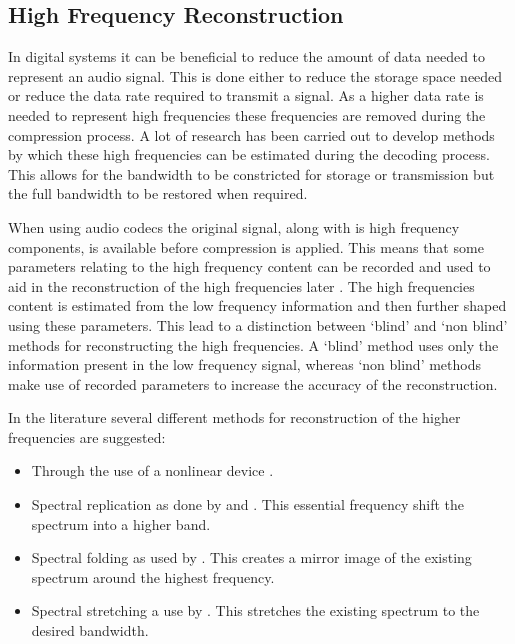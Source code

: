 	\subsection{High Frequency Reconstruction}
	\label{sec:Excitation-Uses-Reconstruction}
		In digital systems it can be beneficial to reduce the amount of data needed to represent an audio signal.
		This is done either to reduce the storage space needed or reduce the data rate required to transmit a
		signal. As a higher data rate is needed to represent high frequencies these frequencies are removed during
		the compression process. A lot of research has been carried out to develop methods by which these high
		frequencies can be estimated during the decoding process. This allows for the bandwidth to be constricted
		for storage or transmission but the full bandwidth to be restored when required.

		When using audio codecs the original signal, along with is high frequency components, is available before
		compression is applied. This means that some parameters relating to the high frequency content can be
		recorded and used to aid in the reconstruction of the high frequencies later \citep{friedrich2007spectral}.
		The high frequencies content is estimated from the low frequency information and then further shaped using
		these parameters. This lead to a distinction between `blind' and `non blind' methods for reconstructing the
		high frequencies. A `blind' method uses only the information present in the low frequency signal, whereas
		`non blind' methods make use of recorded parameters to increase the accuracy of the reconstruction.

		In the literature several different methods for reconstruction of the higher frequencies are suggested:

		\begin{itemize}
			\item Through the use of a nonlinear device \citep{larsen2002efficient, sha2010high}.
			\item Spectral replication as done by \citet{dietz2002spectral} and \citet{nagel2010a}. This
			      essential frequency shift the spectrum into a higher band.
			\item Spectral folding as used by \citet{friedrich2007spectral}. This creates a mirror image of the
			      existing spectrum around the highest frequency.
			\item Spectral stretching a use by \citet{nagel2009a}. This stretches the existing spectrum to the
		              desired bandwidth.
		\end{itemize}

